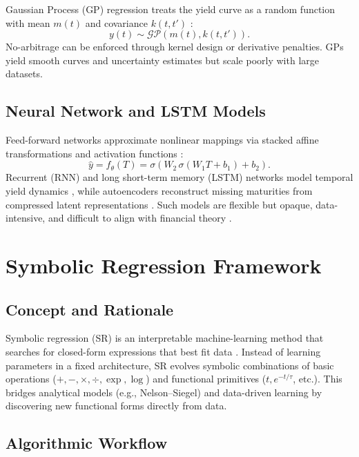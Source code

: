 \documentclass[12pt]{report}
\begin{document}
Gaussian Process (GP) regression treats the yield curve as a random function with mean \(m(t)\) and covariance \(k(t,t')\) \parencite{Lim2023}:
\[
y(t)\sim \mathcal{GP}(m(t),k(t,t')).
\]
No-arbitrage can be enforced through kernel design or derivative penalties.  
GPs yield smooth curves and uncertainty estimates but scale poorly with large datasets.

\subsection{Neural Network and LSTM Models}

Feed-forward networks approximate nonlinear mappings via stacked affine transformations and activation functions \parencite{Heaton2020}:
\[
\hat{y}=f_\theta(T)=\sigma(W_2\,\sigma(W_1T+b_1)+b_2).
\]
Recurrent (RNN) and long short-term memory (LSTM) networks model temporal yield dynamics \parencite{Cao2021}, while autoencoders reconstruct missing maturities from compressed latent representations \parencite{Jeong2022}.  
Such models are flexible but opaque, data-intensive, and difficult to align with financial theory \parencite{MuhleKarbe2019}.

\section{Symbolic Regression Framework}

\subsection{Concept and Rationale}

Symbolic regression (SR) is an interpretable machine-learning method that searches for closed-form expressions that best fit data \parencite{SchmidtLipson2009,UdrescuTegmark2020}.  
Instead of learning parameters in a fixed architecture, SR evolves symbolic combinations of basic operations (\(+,-,\times,\div,\exp,\log\)) and functional primitives (\(t, e^{-t/\tau}\), etc.).  
This bridges analytical models (e.g., Nelson–Siegel) and data-driven learning by discovering new functional forms directly from data.

\subsection{Algorithmic Workflow}
\end{document}
